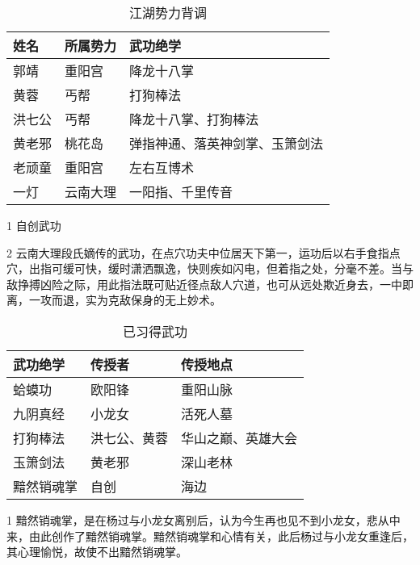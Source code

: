 \documentclass[print, promaster, vlined]{DissertUESTC}
\begin{document}
	\begin{table}[!ht]
		\caption{江湖势力背调} \label{tab: 江湖势力背调}
		\begin{threeparttable}
			\begin{tabular}{p{2cm} p{3cm} p{7cm}}
				\toprule
				\textbf{姓名} & \textbf{所属势力} & \textbf{武功绝学} \\
				\midrule
				郭靖 & 重阳宫 & 降龙十八掌 \\
				黄蓉 & 丐帮 & 打狗棒法 \\
				洪七公 & 丐帮 & 降龙十八掌、打狗棒法 \\
				黄老邪 & 桃花岛 & 弹指神通、落英神剑掌、玉箫剑法 \\
				老顽童 & 重阳宫 & 左右互博术\tnote{1} \\
				一灯 & 云南大理 & 一阳指\tnote{2}、千里传音 \\
				\bottomrule
			\end{tabular}
			\begin{tablenotes}
				\item[1] 自创武功
				\item[2] 云南大理段氏嫡传的武功，在点穴功夫中位居天下第一，运功后以右手食指点穴，出指可缓可快，缓时潇洒飘逸，快则疾如闪电，但着指之处，分毫不差。当与敌挣搏凶险之际，用此指法既可贴近径点敌人穴道，也可从远处欺近身去，一中即离，一攻而退，实为克敌保身的无上妙术。
			\end{tablenotes}
		\end{threeparttable}
	\end{table}
	
	\begin{table}[!ht]
		\caption{已习得武功} \label{tab: 已习得武功}
		\begin{threeparttable}
			\begin{tabular}{p{3cm} p{3cm} p{5cm}}
				\toprule
				\textbf{武功绝学} & \textbf{传授者} & \textbf{传授地点} \\
				\midrule
				蛤蟆功 & 欧阳锋 & 重阳山脉 \\
				九阴真经 & 小龙女 & 活死人墓 \\
				打狗棒法 & 洪七公、黄蓉 & 华山之巅、英雄大会 \\
				玉箫剑法 & 黄老邪 & 深山老林 \\
				黯然销魂掌\tnote{1} & 自创 & 海边 \\
				\bottomrule
			\end{tabular}
			\begin{tablenotes}[online]
				\item[1] 黯然销魂掌，是在杨过与小龙女离别后，认为今生再也见不到小龙女，悲从中来，由此创作了黯然销魂掌。黯然销魂掌和心情有关，此后杨过与小龙女重逢后，其心理愉悦，故使不出黯然销魂掌。
			\end{tablenotes}
		\end{threeparttable}
	\end{table}
	
\end{document}
